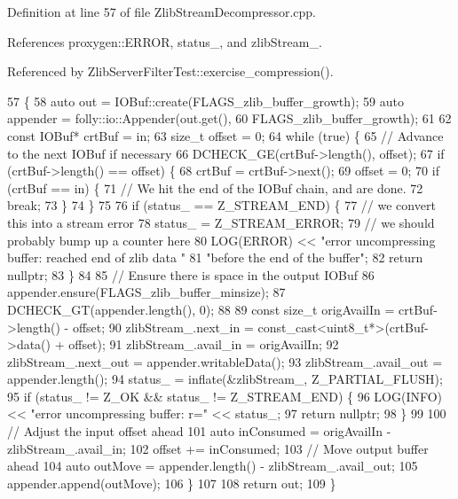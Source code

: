 Definition at line 57 of file Zlib\+Stream\+Decompressor.\+cpp.



References proxygen\+::\+E\+R\+R\+OR, status\+\_\+, and zlib\+Stream\+\_\+.



Referenced by Zlib\+Server\+Filter\+Test\+::exercise\+\_\+compression().


\begin{DoxyCode}
57                                                                        \{
58   \textcolor{keyword}{auto} out = IOBuf::create(FLAGS\_zlib\_buffer\_growth);
59   \textcolor{keyword}{auto} appender = folly::io::Appender(out.get(),
60       FLAGS\_zlib\_buffer\_growth);
61 
62   \textcolor{keyword}{const} IOBuf* crtBuf = in;
63   \textcolor{keywordtype}{size\_t} offset = 0;
64   \textcolor{keywordflow}{while} (\textcolor{keyword}{true}) \{
65     \textcolor{comment}{// Advance to the next IOBuf if necessary}
66     DCHECK\_GE(crtBuf->length(), offset);
67     \textcolor{keywordflow}{if} (crtBuf->length() == offset) \{
68       crtBuf = crtBuf->next();
69       offset = 0;
70       \textcolor{keywordflow}{if} (crtBuf == in) \{
71         \textcolor{comment}{// We hit the end of the IOBuf chain, and are done.}
72         \textcolor{keywordflow}{break};
73       \}
74     \}
75 
76     \textcolor{keywordflow}{if} (status_ == Z\_STREAM\_END) \{
77       \textcolor{comment}{// we convert this into a stream error}
78       status_ = Z\_STREAM\_ERROR;
79       \textcolor{comment}{// we should probably bump up a counter here}
80       LOG(ERROR) << \textcolor{stringliteral}{"error uncompressing buffer: reached end of zlib data "}
81         \textcolor{stringliteral}{"before the end of the buffer"};
82       \textcolor{keywordflow}{return} \textcolor{keyword}{nullptr};
83     \}
84 
85     \textcolor{comment}{// Ensure there is space in the output IOBuf}
86     appender.ensure(FLAGS\_zlib\_buffer\_minsize);
87     DCHECK\_GT(appender.length(), 0);
88 
89     \textcolor{keyword}{const} \textcolor{keywordtype}{size\_t} origAvailIn = crtBuf->length() - offset;
90     zlibStream_.next\_in = \textcolor{keyword}{const\_cast<}uint8\_t*\textcolor{keyword}{>}(crtBuf->data() + offset);
91     zlibStream_.avail\_in = origAvailIn;
92     zlibStream_.next\_out = appender.writableData();
93     zlibStream_.avail\_out = appender.length();
94     status_ = inflate(&zlibStream_, Z\_PARTIAL\_FLUSH);
95     \textcolor{keywordflow}{if} (status_ != Z\_OK && status_ != Z\_STREAM\_END) \{
96       LOG(INFO) << \textcolor{stringliteral}{"error uncompressing buffer: r="} << status_;
97       \textcolor{keywordflow}{return} \textcolor{keyword}{nullptr};
98     \}
99 
100     \textcolor{comment}{// Adjust the input offset ahead}
101     \textcolor{keyword}{auto} inConsumed = origAvailIn - zlibStream_.avail\_in;
102     offset += inConsumed;
103     \textcolor{comment}{// Move output buffer ahead}
104     \textcolor{keyword}{auto} outMove = appender.length() - zlibStream_.avail\_out;
105     appender.append(outMove);
106   \}
107 
108   \textcolor{keywordflow}{return} out;
109 \}
\end{DoxyCode}
